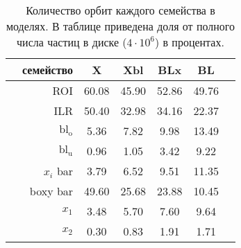 \documentclass[tikz]{trlnotes}
\begin{document}
\begin{table}[hb]
  \centering
  \begin{tabular}{cr|ccccc}
    \toprule
              & семейство            & X     & Xbl   & BLx   & BL    & \\
    \midrule
              & ROI                  & 60.08 & 45.90 & 52.86 & 49.76 & \\
              & ILR                  & 50.40 & 32.98 & 34.16 & 22.37 & \\
              & $\text{bl}_\text{o}$ & 5.36  & 7.82  & 9.98  & 13.49 & \\
              & $\text{bl}_\text{u}$ & 0.96  & 1.05  & 3.42  & 9.22  & \\
              & $x_i$ bar            & 3.79  & 6.52  & 9.51  & 11.35 & \\
              & boxy bar             & 49.60 & 25.68 & 23.88 & 10.45 & \\
              & $x_1$                & 3.48  & 5.70  & 7.60  & 9.64  & \\
              & $x_2$                & 0.30  & 0.83  & 1.91  & 1.71  & \\
    \bottomrule
  \end{tabular}
  \caption{Количество орбит каждого семейства в моделях. В таблице приведена доля от полного числа частиц в диске ($4\cdot 10^6$) в процентах.}
  \label{tab:familiesnumbers}
\end{table}
\end{document}
